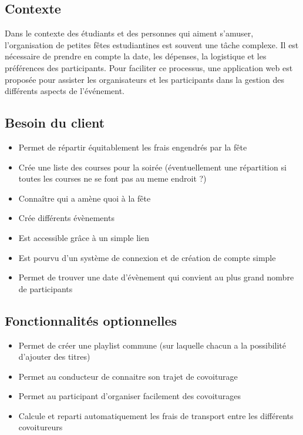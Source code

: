 \subsection{Contexte}\label{subsec:contexte}
Dans le contexte des étudiants et des personnes qui aiment s'amuser, l'organisation de petites fêtes estudiantines est souvent une tâche complexe.
Il est nécessaire de prendre en compte la date, les dépenses, la logistique et les préférences des participants.
Pour faciliter ce processus, une application web est proposée pour assister les organisateurs et les participants dans la gestion des différents aspects de l'événement.

\subsection{Besoin du client}\label{subsec:besoin-du-client}
\begin{itemize}
    \item Permet de répartir équitablement les frais engendrés par la fête
    \item Crée une liste des courses pour la soirée (éventuellement une répartition si toutes les courses ne se font pas au meme endroit ?)
    \item Connaître qui a amène quoi à la fête
    \item Crée différents évènements
    \item Est accessible grâce à un simple lien
    \item Est pourvu d'un système de connexion et de création de compte simple
    \item Permet de trouver une date d’évènement qui convient au plus grand nombre de participants
\end{itemize}

\subsection{Fonctionnalités optionnelles}\label{subsec:fonctionnalites-optionnelles}
\begin{itemize}
    \item Permet de créer une playlist commune (sur laquelle chacun a la possibilité d'ajouter des titres)
    \item Permet au conducteur de connaitre son trajet de covoiturage
    \item Permet au participant d'organiser facilement des covoiturages
    \item Calcule et reparti automatiquement les frais de transport entre les différents covoitureurs
\end{itemize}

